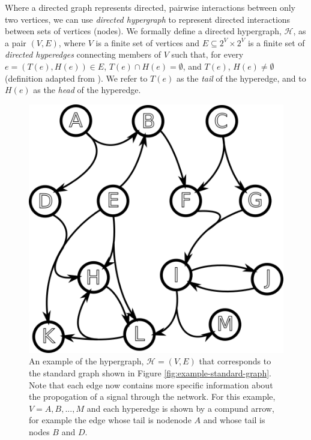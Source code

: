 \documentclass[12pt,twoside]{reedthesis}
\theoremstyle{definition}
\begin{document}
Where a directed graph represents directed, pairwise interactions between only two vertices, we can use \textit{directed hypergraph} to represent directed interactions between sets of vertices (nodes). We formally define a directed hypergraph, $\mathcal{H}$, as a pair $(V,E)$, where $V$ is a finite set of vertices and $E \subseteq 2^V \times 2^V$ is a finite set of \textit{directed hyperedges} connecting members of $V$ such that, for every $e=(T(e),H(e)) \in E$, $T(e) \cap H(e) = \emptyset$, and $T(e)$, $H(e) \neq \emptyset$ (definition adapted from \cite{Gallo1993}).  We refer to $T(e)$ as the \textit{tail} of the hyperedge, and to $H(e)$ as the \textit{head} of the hyperedge.\par

\begin{figure}[thbp]
  \begin{center}
    \includegraphics[width=\textwidth/2]{example-hypergraph}
  \caption[An example directed hypergraph]{An example of the hypergraph, $\mathcal{H}=(V,E)$ that corresponds to the standard graph shown in Figure \ref{fig:example-standard-graph}. Note that each edge now contains more specific information about the propogation of a signal through the network. For this example, $V={A,B,...,M}$ and each hyperedge is shown by a compund arrow, for example the edge whose tail is nodenode $A$ and whose tail is nodes $B$ and $D$.}
  \label{fig:example-hypergraph}
  \end{center}
\end{figure}
\end{document}
